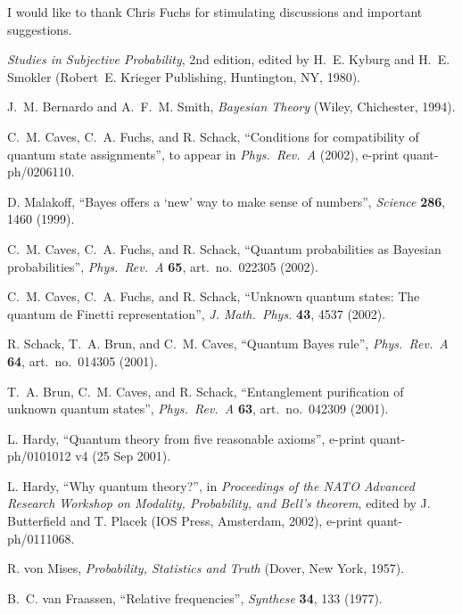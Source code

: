 \documentclass[pra,12pt,tightenlines]{revtex4-2}
\begin{document}
I would like to thank Chris Fuchs for stimulating discussions and 
important suggestions. 

%
%

\begin{thebibliography}{10}

{\em Studies in Subjective Probability}, 2nd edition, 
edited by H.~E. Kyburg and H.~E. Smokler 
(Robert~E. Krieger Publishing, Huntington, NY, 1980).

J.~M. Bernardo and A.~F.~M. Smith, {\em Bayesian Theory\/} (Wiley, Chichester,
  1994).

C.~M. Caves, C.~A. Fuchs, and R. Schack, 
``Conditions for compatibility of quantum state assignments'',
to appear in {\it Phys.\ Rev.\ A\/} (2002), e-print quant-ph/0206110.

D. Malakoff, ``Bayes offers a `new' way to make sense of numbers'',
{\it Science\/} {\bf 286},  1460  (1999).

C.~M. Caves, C.~A. Fuchs, and R. Schack, 
``Quantum probabilities as Bayesian probabilities'',
{\it Phys.\ Rev.\ A\/} {\bf 65},
  art.~no.~022305 (2002).

C.~M. Caves, C.~A. Fuchs, and R. Schack, 
``Unknown quantum states: The quantum de Finetti representation'',
{\it J. Math.\ Phys.} {\bf 43},  4537 (2002).

R. Schack, T.~A. Brun, and C.~M. Caves, 
``Quantum Bayes rule'',
{\it Phys.\ Rev.\ A\/} {\bf 64},  art.~no.~014305 (2001).

T.~A. Brun, C.~M. Caves, and R. Schack, 
``Entanglement purification of unknown quantum states'',
{\it Phys.\ Rev.\ A\/} {\bf 63},  art.~no.~042309 (2001).

L. Hardy, ``Quantum theory from five reasonable axioms'', 
e-print quant-ph/0101012 v4 (25 Sep 2001).

L. Hardy, ``Why quantum theory?'',
in {\em Proceedings of the NATO Advanced Research Workshop on
  Modality, Probability, and Bell's theorem}, edited by J. Butterfield and T.
  Placek (IOS Press, Amsterdam, 2002), e-print quant-ph/0111068.

R. von Mises, {\em Probability, Statistics and Truth\/} 
(Dover, New York, 1957).

B.~C. van Fraassen, 
``Relative frequencies'', {\it Synthese\/} {\bf 34},  133  (1977).


\end{thebibliography}
\end{document}
